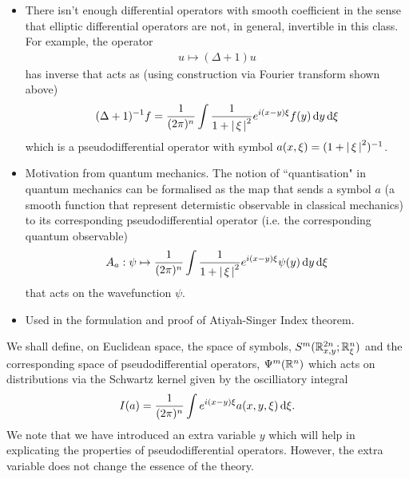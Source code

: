 \documentclass{article}
\begin{document}
\begin{itemize}
    \item  There isn't enough differential operators with smooth coefficient in the sense that elliptic differential operators are not, in general, invertible in this class. For example, the operator
    \begin{align*}
    u \mapsto (\Delta + 1) u 
    \end{align*}
    has inverse that acts as (using construction via Fourier transform shown above)
    \begin{align*}
    (\Delta+ 1)^{-1} f = \frac{1}{(2\pi)^n} \int \frac{1}{1 + \abs{\xi}^2} e^{i(x -y) \xi} f(y)\d[y] \d[\xi]
    \end{align*}
    which is a pseudodifferential operator with symbol $a(x, \xi) = (1 + \abs{\xi}^2)^{-1}$. 
    
    \item Motivation from quantum mechanics. The notion of ``quantisation" in quantum mechanics can be formalised as the map that sends a symbol $a$ (a smooth function that represent determistic observable in classical mechanics) to its corresponding pseudodifferential operator (i.e. the corresponding quantum observable)
    \begin{align*}
    A_a : \psi \mapsto \frac{1}{(2\pi)^n} \int \frac{1}{1 + \abs{\xi}^2} e^{i(x -y) \xi} \psi(y)\d[y] \d[\xi]
    \end{align*}
    that acts on the wavefunction $\psi$. 
    
    \item Used in the formulation and proof of Atiyah-Singer Index theorem. 
\end{itemize}

We shall define, on Euclidean space, the space of symbols, $S^m(\R^{2n}_{x, y}; \R^n_{\xi})$ and the corresponding space of pseudodifferential operators, $\Psi^m(\R^n)$ which acts on distributions via the Schwartz kernel given by the oscilliatory integral 
\begin{align*}
I(a) = \frac{1}{(2\pi)^n} \int e^{i(x- y)\xi} a(x, y, \xi) \d[\xi]. 
\end{align*}
We note that we have introduced an extra variable $y$ which will help in explicating the properties of pseudodifferential operators. However, the extra variable does not change the essence of the theory. 
\end{document}
